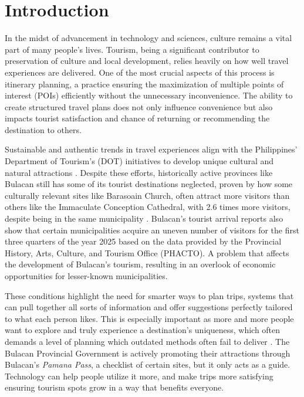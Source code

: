 \section{Introduction}

In the midst of advancement in technology and sciences, culture remains a vital part of many people’s lives. Tourism, being a significant contributor to preservation of culture and local development, relies heavily on how well travel experiences are delivered. One of the most crucial aspects of this process is itinerary planning, a practice ensuring the maximization of multiple points of interest (POIs) efficiently without the unnecessary inconvenience. The ability to create structured travel plans does not only influence convenience but also impacts tourist satisfaction and chance of returning or recommending the destination to others.

Sustainable and authentic trends in travel experiences align with the Philippines’ Department of Tourism’s (DOT) initiatives to develop unique cultural and natural attractions \parencite{DOT2023}. Despite these efforts, historically active provinces like Bulacan still has some of its tourist destinations neglected, proven by how some culturally relevant sites like Barasoain Church, often attract more visitors than others like the Immaculate Conception Cathedral, with 2.6 times more visitors, despite being in the same municipality \parencite{Canet2025S}. Bulacan’s tourist arrival reports also show that certain municipalities acquire an uneven number of visitors for the first three quarters of the year 2025 based on the data provided by the Provincial History, Arts, Culture, and Tourism Office (PHACTO). A problem that affects the development of Bulacan’s tourism, resulting in an overlook of economic opportunities for lesser-known municipalities.

These conditions highlight the need for smarter ways to plan trips, systems that can pull together all sorts of information and offer suggestions perfectly tailored to what each person likes. This is especially important as more and more people want to explore and truly experience a destination’s uniqueness, which often demands a level of planning which outdated methods often fail to deliver \parencite{Halder2022}. The Bulacan Provincial Government is actively promoting their attractions through Bulacan’s \textit{Pamana Pass}, a checklist of certain sites, but it only acts as a guide. Technology can help people utilize it more, and make trips more satisfying ensuring tourism spots grow in a way that benefits everyone.

